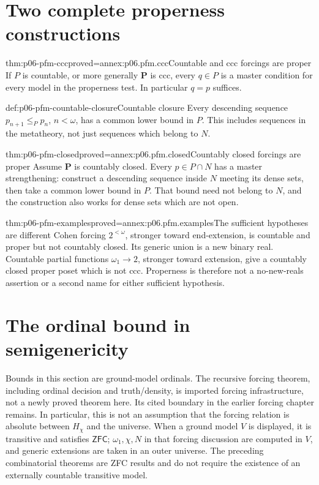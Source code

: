 \section{Two complete properness constructions}
\label{sec:p06-pfm-constructions}

\begin{hbtheorem}{thm:p06-pfm-ccc}{proved=annex:p06.pfm.ccc}{Countable and ccc forcings are proper}
If \(P\) is countable, or more generally \(\mathbf P\) is ccc, every \(q\in P\)
is a master condition for every model in the properness test.
In particular \(q=p\) suffices.
\end{hbtheorem}

\begin{hbdefinition}{def:p06-pfm-countable-closure}{Countable closure}
Every descending sequence \(p_{n+1}\leq_P p_n\), \(n<\omega\), has a common
lower bound in \(P\). This includes sequences in the metatheory, not just
sequences which belong to \(N\).
\end{hbdefinition}

\begin{hbtheorem}{thm:p06-pfm-closed}{proved=annex:p06.pfm.closed}{Countably closed forcings are proper}
Assume \(\mathbf P\) is countably closed. Every \(p\in P\cap N\) has a master strengthening: construct a descending
sequence inside \(N\) meeting its dense sets, then take a common lower
bound in \(P\). That bound need not belong to \(N\), and the construction
also works for dense sets which are not open.
\end{hbtheorem}

\begin{hbtheorem}{thm:p06-pfm-examples}{proved=annex:p06.pfm.examples}{The sufficient hypotheses are different}
Cohen forcing \(2^{<\omega}\), stronger toward end-extension, is countable
and proper but not countably closed. Its generic union is a new binary real.
Countable partial functions \(\omega_1\to2\), stronger toward extension,
give a countably closed proper poset which is not ccc.
Properness is therefore not a no-new-reals assertion or a second name for
either sufficient hypothesis.
\end{hbtheorem}

\section{The ordinal bound in semigenericity}
\label{sec:p06-pfm-semiproper}

Bounds in this section are ground-model ordinals. The recursive forcing
theorem, including ordinal decision and truth/density, is imported forcing
infrastructure, not a newly proved theorem here. Its cited boundary in the
earlier forcing chapter remains. In particular, this is not an assumption
that the forcing relation is absolute between \(H_\chi\) and the universe.
When a ground model \(V\) is displayed, it is transitive and satisfies
\(\mathsf{ZFC}\); \(\omega_1,\chi,N\) in that forcing discussion are
computed in \(V\), and generic extensions are taken in an outer universe.
The preceding combinatorial theorems are ZFC results and do not require
the existence of an externally countable transitive model.

